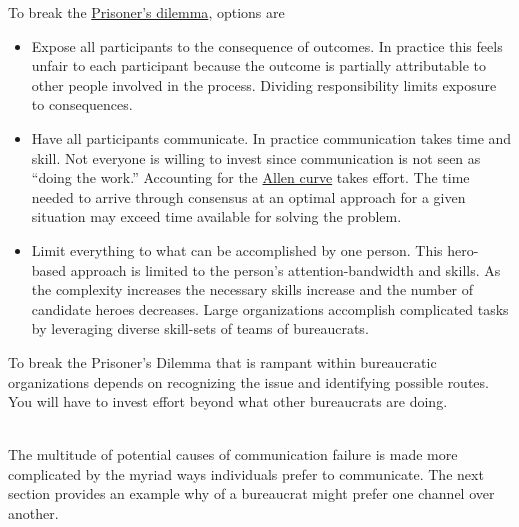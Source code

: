 To break the 
\href{https://en.wikipedia.org/wiki/Prisoner\%27s\_dilemma}{Prisoner's dilemma}, 
\iftoggle{WPinmargin}{\marginpar{[Wikipedia] Prisoner's\\dilemma}}{}
options are 
\begin{itemize}
    \item Expose all participants to the consequence of outcomes. In practice this feels unfair to each participant because the outcome is partially attributable to other people involved in the process. Dividing responsibility limits exposure to consequences.
    \item Have all participants communicate. In practice communication takes time and skill. Not everyone is willing to invest since communication is not seen as ``doing the work.'' Accounting for the \href{https://en.wikipedia.org/wiki/Allen\_curve}{Allen curve}
    \iftoggle{WPinmargin}{\marginpar{[Wikipedia] Allen\\curve}}{}
    takes effort. The time needed to arrive through consensus at an optimal approach for a given situation may exceed time available for solving the problem.
    \item Limit everything to what can be accomplished by one person. This hero-based approach is limited to the person's attention-bandwidth and skills. As the complexity increases the necessary skills increase and the number of candidate heroes decreases. Large organizations accomplish complicated tasks by leveraging diverse skill-sets of teams of bureaucrats.
\end{itemize}
To break the Prisoner's Dilemma that is rampant within bureaucratic organizations depends on recognizing the issue and identifying possible routes. You will have to invest effort beyond what other bureaucrats are doing.



\ \\


The multitude of potential causes of communication failure is made more complicated by the myriad ways individuals prefer to communicate. The next section provides an example why of a bureaucrat might prefer one channel over another. 
 
 
